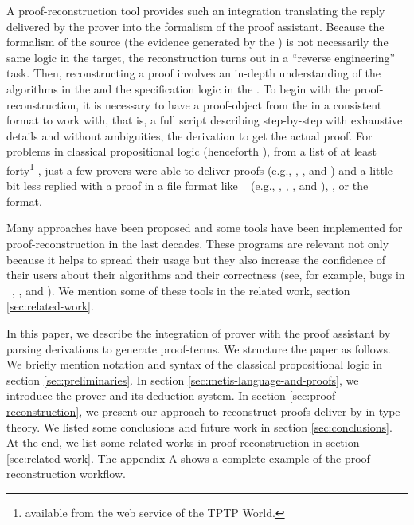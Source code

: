 \documentclass[../main.tex]{subfiles}
\begin{document}
A proof-reconstruction tool provides such an integration translating
the reply delivered by the prover into the formalism of the proof
assistant. Because the formalism of the source (the evidence
generated by the \ATP) is not necessarily the same logic in the
target, the reconstruction turns out in a ``reverse engineering''
task. Then, reconstructing a proof involves an in-depth
understanding of the algorithms in the \ATP and the specification
logic in the \ITP. To begin with the proof-reconstruction, it is
necessary to have a proof-object from the \ATP in a consistent
format to work with, that is, a full script describing step-by-step
with exhaustive details and without ambiguities, the derivation to
get the actual proof.
For problems in classical propositional logic (henceforth \CPL),
from a list of at least forty\footnote{\ATPs available from the web
service  of the TPTP World.} \ATPs, just a few
provers were able to deliver proofs (e.g., 
\cite{Barrett2011}, , and 
\cite{hillenbrand1997}) and a little bit less replied with a proof
in a file format like \TSTP~\cite{sutcliffe2004tstp} (e.g.,
, \Metis, , and ), 
\cite{Stump2008}, or the ~\cite{Bohme2011} format.

Many approaches have been proposed and some tools have been
implemented for proof-reconstruction in the last decades. These
programs are relevant not only because it helps to spread their
usage but they also increase the confidence of their users about
their algorithms and their correctness (see, for example, bugs in
\ATPs~\cite{Keller2013}, \cite{Bohme2011}, \cite{Fleury2014} and
\cite{Kanso2012}). We mention some of these tools in the related 
work, section \ref{sec:related-work}.

In this paper, we describe the integration of \Metis prover with the
proof assistant \Agda by parsing \TSTP derivations to generate \Agda
proof-terms. We structure the paper as follows. 
We briefly mention notation and syntax of the classical propositional
logic in section \ref{sec:preliminaries}.
In section \ref{sec:metis-language-and-proofs}, we introduce the
\Metis prover and its deduction system.
In section \ref{sec:proof-reconstruction}, we present our
approach to reconstruct proofs deliver by \Metis in type theory.
We listed some conclusions and future work in section
\ref{sec:conclusions}. At the end, we list some related works in 
proof reconstruction in section \ref{sec:related-work}.
The appendix \textsc{A} shows a complete example of the proof 
reconstruction workflow.
\end{document}
